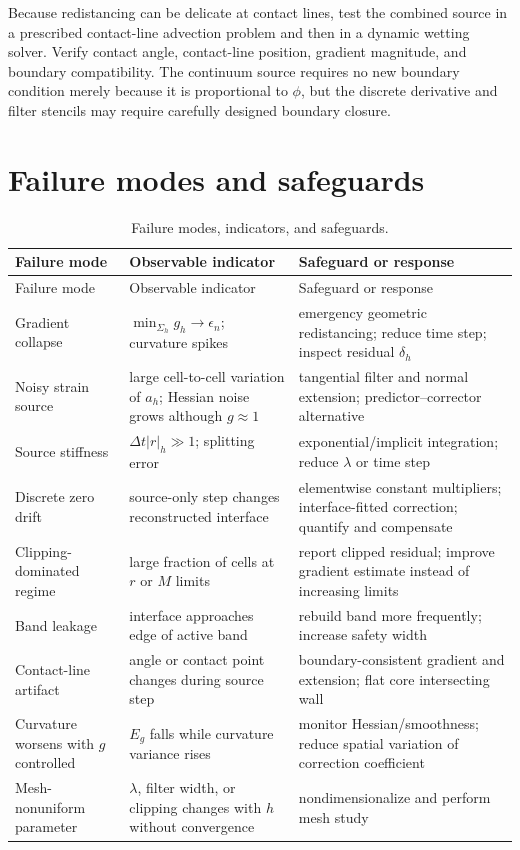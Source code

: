 \documentclass[11pt,a4paper]{article}
\theoremstyle{definition}
\theoremstyle{remark}
\newcommand{\abs}[1]{\left\lvert #1\right\rvert}
\begin{document}
Because redistancing can be delicate at contact lines, test the combined source in a prescribed contact-line advection problem and then in a dynamic wetting solver. Verify contact angle, contact-line position, gradient magnitude, and boundary compatibility. The continuum source requires no new boundary condition merely because it is proportional to $\phi$, but the discrete derivative and filter stencils may require carefully designed boundary closure.

\section{Failure modes and safeguards}

\begin{longtable}{@{}p{}p{}p{}@{}}
\caption{Failure modes, indicators, and safeguards.}\label{tab:failure-modes}\\
\toprule
Failure mode & Observable indicator & Safeguard or response \\
\midrule
\endfirsthead
\toprule
Failure mode & Observable indicator & Safeguard or response \\
\midrule
\endhead
Gradient collapse & $\min_{\Sigma_h}g_h\to\epsilon_n$; curvature spikes & emergency geometric redistancing; reduce time step; inspect residual $\delta_h$ \\
Noisy strain source & large cell-to-cell variation of $a_h$; Hessian noise grows although $g\approx1$ & tangential filter and normal extension; predictor--corrector alternative \\
Source stiffness & $\Delta t\abs r_h\gg1$; splitting error & exponential/implicit integration; reduce $\lambda$ or time step \\
Discrete zero drift & source-only step changes reconstructed interface & elementwise constant multipliers; interface-fitted correction; quantify and compensate \\
Clipping-dominated regime & large fraction of cells at $r$ or $M$ limits & report clipped residual; improve gradient estimate instead of increasing limits \\
Band leakage & interface approaches edge of active band & rebuild band more frequently; increase safety width \\
Contact-line artifact & angle or contact point changes during source step & boundary-consistent gradient and extension; flat core intersecting wall \\
Curvature worsens with $g$ controlled & $E_g$ falls while curvature variance rises & monitor Hessian/smoothness; reduce spatial variation of correction coefficient \\
Mesh-nonuniform parameter & $\lambda$, filter width, or clipping changes with $h$ without convergence & nondimensionalize and perform mesh study \\
\bottomrule
\end{longtable}
\end{document}
